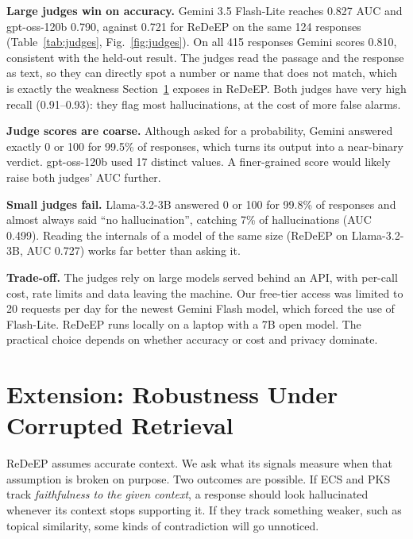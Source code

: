 \documentclass[conference]{IEEEtran}
\begin{document}
\textbf{Large judges win on accuracy.} Gemini 3.5 Flash-Lite reaches 0.827 AUC and gpt-oss-120b 0.790, against 0.721 for ReDeEP on the same 124 responses (Table~\ref{tab:judges}, Fig.~\ref{fig:judges}). On all 415 responses Gemini scores 0.810, consistent with the held-out result. The judges read the passage and the response as text, so they can directly spot a number or name that does not match, which is exactly the weakness Section~\ref{sec:robust} exposes in ReDeEP. Both judges have very high recall (0.91--0.93): they flag most hallucinations, at the cost of more false alarms.

\textbf{Judge scores are coarse.} Although asked for a probability, Gemini answered exactly 0 or 100 for 99.5\% of responses, which turns its output into a near-binary verdict. gpt-oss-120b used 17 distinct values. A finer-grained score would likely raise both judges' AUC further.

\textbf{Small judges fail.} Llama-3.2-3B answered 0 or 100 for 99.8\% of responses and almost always said ``no hallucination'', catching 7\% of hallucinations (AUC 0.499). Reading the internals of a model of the same size (ReDeEP on Llama-3.2-3B, AUC 0.727) works far better than asking it.

\textbf{Trade-off.} The judges rely on large models served behind an API, with per-call cost, rate limits and data leaving the machine. Our free-tier access was limited to 20 requests per day for the newest Gemini Flash model, which forced the use of Flash-Lite. ReDeEP runs locally on a laptop with a 7B open model. The practical choice depends on whether accuracy or cost and privacy dominate.

\section{Extension: Robustness Under Corrupted Retrieval}
\label{sec:robust}
ReDeEP assumes accurate context. We ask what its signals measure when that assumption is broken on purpose. Two outcomes are possible. If ECS and PKS track \emph{faithfulness to the given context}, a response should look hallucinated whenever its context stops supporting it. If they track something weaker, such as topical similarity, some kinds of contradiction will go unnoticed.
\end{document}
